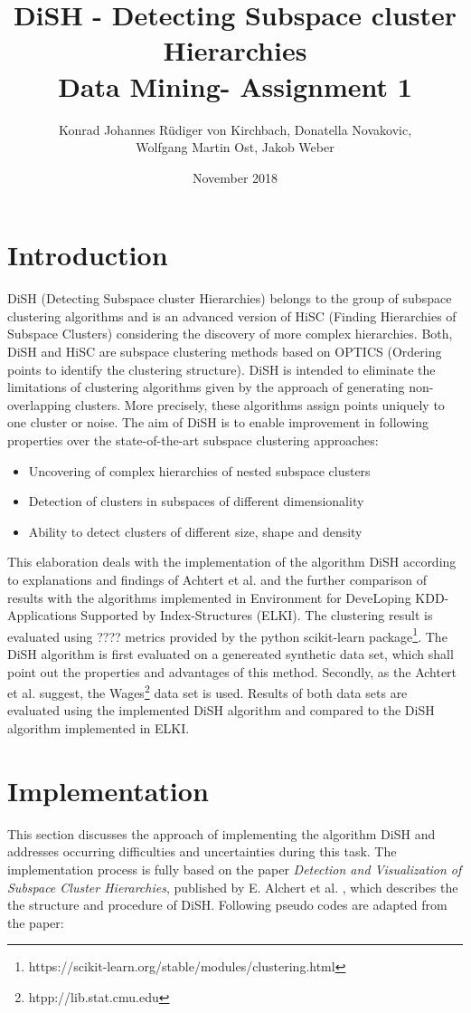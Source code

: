 \documentclass{article}
\title{DiSH - Detecting Subspace cluster Hierarchies \\ Data Mining- Assignment 1}
\author{Konrad Johannes Rüdiger von Kirchbach, Donatella Novakovic, \\ Wolfgang Martin Ost, Jakob Weber}
\date{November 2018}
\begin{document}
\maketitle

\section{Introduction}
DiSH (Detecting Subspace cluster Hierarchies) belongs to the group of subspace clustering algorithms and is an advanced version of HiSC (Finding Hierarchies of Subspace Clusters) considering the discovery of more complex hierarchies. Both, DiSH and HiSC are subspace clustering methods based on OPTICS (Ordering points to identify the clustering structure). DiSH is intended to eliminate the limitations of clustering algorithms given by the approach of generating non-overlapping clusters. More precisely, these algorithms assign points uniquely to one cluster or noise. The aim of DiSH is to enable improvement in following properties over the state-of-the-art subspace clustering approaches\cite{achtert2007detection}: 
\begin{itemize}
    \item Uncovering of complex hierarchies of nested subspace clusters
    \item Detection of clusters in subspaces of different dimensionality
    \item Ability to detect clusters of different size, shape and density
\end{itemize}

This elaboration deals with the implementation of the algorithm DiSH according to explanations and findings of Achtert et al.\cite{achtert2007detection} and the further comparison of results with the algorithms implemented in Environment for DeveLoping KDD-Applications Supported by Index-Structures (ELKI). The clustering result is evaluated using ???? metrics provided by the python scikit-learn package\footnote{https://scikit-learn.org/stable/modules/clustering.html}. The DiSH algorithm is first evaluated on a genereated synthetic data set, which shall point out the properties and advantages of this method. Secondly, as the Achtert et al. suggest, the Wages\footnote{htpp://lib.stat.cmu.edu} data set is used. Results of both data sets are evaluated using the implemented DiSH algorithm and compared to the DiSH algorithm implemented in ELKI.    

\section{Implementation}
This section discusses the approach of implementing the algorithm DiSH and addresses occurring difficulties and uncertainties during this task. The implementation process is fully based on the paper \emph{Detection and Visualization of Subspace Cluster Hierarchies}, published by E. Alchert et al. , which describes the the structure and procedure of DiSH. Following pseudo codes are adapted from the paper:\par
\end{document}
